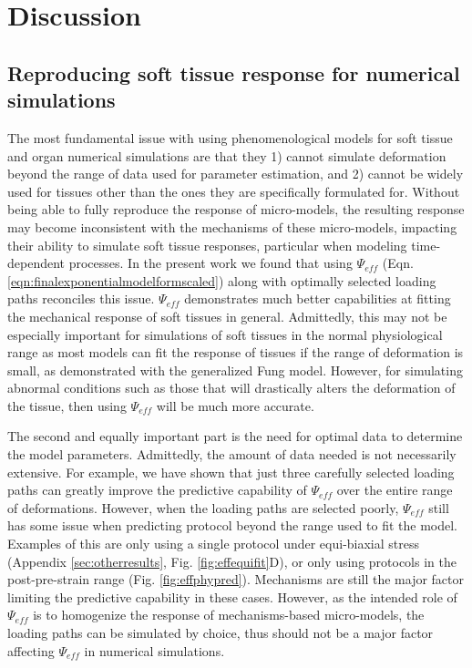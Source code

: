 
\section{Discussion}

\subsection{Reproducing soft tissue response for numerical simulations}

	The most fundamental issue with using phenomenological models for soft tissue and organ numerical simulations are that they 1) cannot simulate deformation beyond the range of data used for parameter estimation, and 2) cannot be widely used for tissues other than the ones they are specifically formulated for. Without being able to fully reproduce the response of micro-models, the resulting response may become inconsistent with the mechanisms of these micro-models, impacting their ability to simulate soft tissue responses, particular when modeling time-dependent processes. In the present work we found that using $\Psi_{eff}$ (Eqn. \ref{eqn:finalexponentialmodelformscaled}) along with optimally selected loading paths reconciles this issue. $\Psi_{eff}$ demonstrates much better capabilities at fitting the mechanical response of soft tissues in general. Admittedly, this may not be especially important for simulations of soft tissues in the normal physiological range as most models can fit the response of tissues if the range of deformation is small, as demonstrated with the generalized Fung model. However, for simulating abnormal conditions such as those that will drastically alters the deformation of the tissue, then using $\Psi_{eff}$ will be much more accurate. 
    
    The second and equally important part is the need for optimal data to determine the model parameters. Admittedly, the amount of data needed is not necessarily extensive. For example, we have shown that just three carefully selected loading paths can greatly improve the predictive capability of $\Psi_{eff}$ over the entire range of deformations. However, when the loading paths are selected poorly, $\Psi_{eff}$ still has some issue when predicting protocol beyond the range used to fit the model. Examples of this are only using a single protocol under equi-biaxial stress (Appendix \ref{sec:otherresults}, Fig. \ref{fig:effequifit}D), or only using protocols in the post-pre-strain range (Fig. \ref{fig:effphypred}). Mechanisms are still the major factor limiting the predictive capability in these cases. However, as the intended role of $\Psi_{eff}$ is to homogenize the response of mechanisms-based micro-models, the loading paths can be simulated by choice, thus should not be a major factor affecting $\Psi_{eff}$ in numerical simulations. 
    

